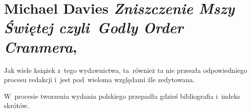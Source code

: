 \documentclass[a4paper,11pt]{article}
\numberwithin{equation}{section}
\begin{document}









\section{Michael Davies \textit{Zniszczenie Mszy Świętej
    czyli~Godly Order Cranmera},
  \parencite{DaviesZniszczenieMszySwietej2016} }





\vspace{0em}


\noindent
Jak wiele książek z~tego wydawnictwa, ta~również ta nie przeszła
odpowiedniego procesu redakcji i~jest pod~wieloma względami źle zedytowana.

\VerSpaceFour





\noindent
W~procesie tworzenia wydania polskiego przepadła gdzieś bibliografia
i~indeks skrótów.





\newpage

\end{document}
